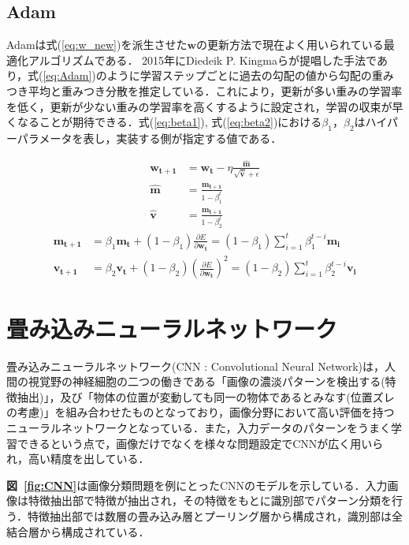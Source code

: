 \documentclass[a4j, 11pt]{jreport}
\newcommand{\figref}[1]{\textbf{図~\ref{#1}}}
\newcommand{\eref}[1]{式(\ref{#1})}
\begin{document}
\newpage
\subsection{Adam}
Adamは\eref{eq:w_new}を派生させた$\bm w$の更新方法で現在よく用いられている最適化アルゴリズムである\cite{Adam}．
2015年にDiedeik P. Kingmaらが提唱した手法であり，\eref{eq:Adam}のように学習ステップごとに過去の勾配の値から勾配の重みつき平均と重みつき分散を推定している．これにより，更新が多い重みの学習率を低く，更新が少ない重みの学習率を高くするように設定され，学習の収束が早くなることが期待できる．\eref{eq:beta1}, \eref{eq:beta2}における$\beta_1，\beta_2$はハイパーパラメータを表し，実装する側が指定する値である．

\begin{align}
	\label{eq:Adam}
	\bm{w_{t+1}} &= \bm{w_{t}} - \eta \frac{\bm{\hat{m}}} {\sqrt{\bm{\hat{v}}} + \epsilon}\\
	\bm{\hat{m}} &= \frac{\bm{m_{t+1}}}{1-\beta_1^t} \nonumber \\
	\bm{\hat{v}} &= \frac{\bm{m_{t+1}}}{1-\beta_2^t} \nonumber
\end{align}
\vspace{-2zh}
\begin{align}
	\bm{m_{t+1}} &= \beta_1\bm{m_t} + (1-\beta_1) \frac{\partial E}{\partial \bm{w_t}} = (1-\beta_1) \sum_{i=1}^{t} \beta_{1}^{t-i} \bm{m_i} \label{eq:beta1} \\
	\bm{v_{t+1}} &= \beta_2\bm{v_t} + (1-\beta_2) (\frac{\partial E}{\partial \bm{w_t}})^2 = (1-\beta_2) \sum_{i=1}^{t} \beta_{2}^{t-i} \bm{v_i} \label{eq:beta2}
\end{align}


\newpage
\section{畳み込みニューラルネットワーク}
畳み込みニューラルネットワーク(CNN : Convolutional Neural Network)は，人間の視覚野の神経細胞の二つの働きである「画像の濃淡パターンを検出する(特徴抽出)」，及び「物体の位置が変動しても同一の物体であるとみなす(位置ズレの考慮)」を組み合わせたものとなっており，画像分野において高い評価を持つニューラルネットワークとなっている\cite{CNN}．また，入力データのパターンをうまく学習できるという点で，画像だけでなくを様々な問題設定でCNNが広く用いられ，高い精度を出している．

\figref{fig:CNN}は画像分類問題を例にとったCNNのモデルを示している．入力画像は特徴抽出部で特徴が抽出され，その特徴をもとに識別部でパターン分類を行う．特徴抽出部では数層の畳み込み層とプーリング層から構成され，識別部は全結合層から構成されている．
\\
\\
\end{document}
